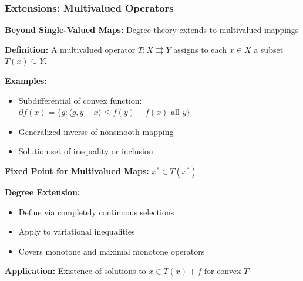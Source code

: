 \documentclass[aspectratio=169,10pt]{beamer}
\begin{document}
\begin{frame}
\frametitle{Extensions: Multivalued Operators}

\textbf{Beyond Single-Valued Maps:} Degree theory extends to multivalued mappings

\vspace{0.3cm}
\textbf{Definition:} A multivalued operator $T: X \rightrightarrows Y$ assigns to each $x \in X$ a subset $T(x) \subseteq Y$.

\vspace{0.3cm}
\textbf{Examples:}
\begin{itemize}
    \item Subdifferential of convex function: $\partial f(x) = \{g : \langle g, y-x \rangle \leq f(y) - f(x) \text{ all } y\}$
    \item Generalized inverse of nonsmooth mapping
    \item Solution set of inequality or inclusion
\end{itemize}

\vspace{0.3cm}
\textbf{Fixed Point for Multivalued Maps:} $x^* \in T(x^*)$

\vspace{0.3cm}
\textbf{Degree Extension:}
\begin{itemize}
    \item Define via completely continuous selections
    \item Apply to variational inequalities
    \item Covers monotone and maximal monotone operators
\end{itemize}

\vspace{0.3cm}
\textbf{Application:} Existence of solutions to $x \in T(x) + f$ for convex $T$
\end{frame}
\end{document}
